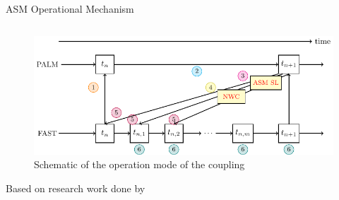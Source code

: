 \documentclass[aspectratio=1610]{beamer}
\begin{document}
\begin{frame}{ASM Operational Mechanism}
\begin{columns}
        \begin{column}{0.4\textwidth}
            \begin{figure}
                \vspace{-1cm}
                \hspace*{-0.7cm} %
                \includegraphics[width=1.2\textwidth]{ASM_representation.pdf}
                \caption{Schematic of the operation mode of the coupling}
                \label{fig:asm_sector}
            \end{figure}
            Based on research work done by \parencite{steinbruck2024, kruger2022}
        \end{column}
    \end{columns}
\end{frame}
\end{document}
